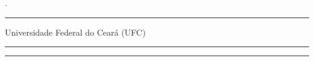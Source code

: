 \begin{folhadeaprovacao}
\begin{center}
\MakeUppercase{\imprimirautor}\par
\vspace*{1.8cm}
\MakeUppercase{\imprimirtitulo}\par
\end{center}
\vspace{1.2cm}
\begin{flushright}
\begin{minipage}{\dimexpr\textwidth-8cm\relax}
\SingleSpacing
\imprimirpreambulo\par
\end{minipage}
\end{flushright}
\vspace{0.65cm}
\noindent{} \DataAprovacao.
\vspace{1cm}
\begin{center}
\textbf{}\par
\vspace{0.75cm}
\begin{minipage}{.84\textwidth}\centering
\rule{\linewidth}{.4pt}\par
\NomeOrientador\par Universidade Federal do Ceará (UFC)

\end{minipage}\par
\ifCoorientadorNaBanca
\ifdefempty{\NomeCoorientador}{}{%
\vspace{0.65cm}
\begin{minipage}{.84\textwidth}\centering
\rule{\linewidth}{.4pt}\par
\NomeCoorientador\par\InstituicaoCoorientador
\end{minipage}\par
}
\fi
\vspace{0.75cm}
\begin{minipage}{.84\textwidth}\centering
\rule{\linewidth}{.4pt}\par
\NomeExaminadorA\par\InstituicaoExaminadorA
\end{minipage}\par
\vspace{0.75cm}
\begin{minipage}{.84\textwidth}\centering
\rule{\linewidth}{.4pt}\par
\NomeExaminadorB\par\InstituicaoExaminadorB
\end{minipage}
\end{center}
\end{folhadeaprovacao}
